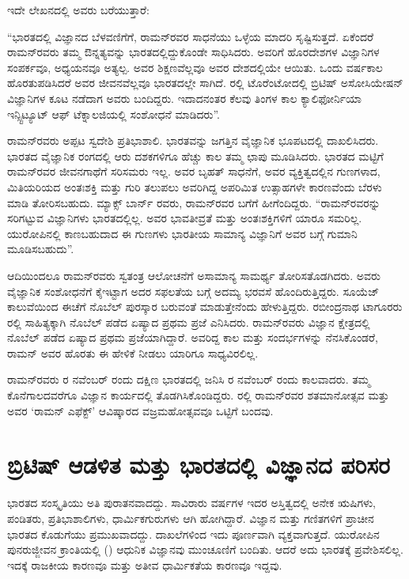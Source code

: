 ಇದೇ ಲೇಖನದಲ್ಲಿ ಅವರು ಬರೆಯುತ್ತಾರೆ:\enginline{-}

“ಭಾರತದಲ್ಲಿ ವಿಜ್ಞಾನದ ಬೆಳವಣಿಗೆಗೆ, ರಾಮನ್‍ರವರ ಸಾಧನೆಯು ಒಳ್ಳೆಯ ಮಾದರಿ ಸೃಷ್ಟಿಸುತ್ತದೆ. ಏಕೆಂದರೆ ರಾಮನ್‍ರವರು ತಮ್ಮ ಔನ್ನತ್ಯವನ್ನು ಭಾರತದಲ್ಲಿದ್ದುಕೊಂಡೇ ಸಾಧಿಸಿದರು. ಅವರಿಗೆ ಹೊರದೇಶಗಳ ವಿಜ್ಞಾನಿಗಳ ಸಂಪರ್ಕವೂ, ಅಧ್ಯಯನವೂ ಅತ್ಯಲ್ಪ. ಅವರ ಶಿಕ್ಷಣವೆಲ್ಲವೂ ಅವರ ದೇಶದಲ್ಲಿಯೇ ಆಯಿತು. ಒಂದು ವರ್ಷಕಾಲ ಹೊರತುಪಡಿಸಿದರೆ ಅವರ ಜೀವನವೆಲ್ಲವೂ ಭಾರತದಲ್ಲೇ ಸಾಗಿದೆ. ರಲ್ಲಿ ಟೊರೆಂಟೋದಲ್ಲಿ ಬ್ರಿಟಿಷ್ ಅಸೋಸಿಯೇಷನ್ ವಿಜ್ಞಾನಿಗಳ ಕೂಟ ನಡೆದಾಗ ಅವರು ಬಂದಿದ್ದರು. ಇದಾದನಂತರ ಕೆಲವು ತಿಂಗಳ ಕಾಲ ಕ್ಯಾಲಿಫೋರ್ನಿಯಾ ಇನ್ಸ್ಟಿಟ್ಯೂಟ್ ಆಫ್ ಟೆಕ್ನಾಲಜಿಯಲ್ಲಿ ಸಂಶೋಧನೆ ಮಾಡಿದರು”.

ರಾಮನ್‍ರವರು ಅಪ್ಪಟ ಸ್ವದೇಶಿ ಪ್ರತಿಭಾಶಾಲಿ. ಭಾರತವನ್ನು ಜಗತ್ತಿನ ವೈಜ್ಞಾನಿಕ ಭೂಪಟದಲ್ಲಿ ದಾಖಲಿಸಿದರು. ಭಾರತದ ವೈಜ್ಞಾನಿಕ ರಂಗದಲ್ಲಿ ಆರು ದಶಕಗಳಿಗೂ ಹೆಚ್ಚು ಕಾಲ ತಮ್ಮ ಛಾಪು ಮೂಡಿಸಿದರು. ಭಾರತದ ಮಟ್ಟಿಗೆ ರಾಮನ್‍ರವರ ಜೀವನಗಾಥೆಗೆ ಸರಿಸಮರು ಇಲ್ಲ. ಅವರ ಬೃಹತ್ ಸಾಧನೆಗೆ, ಅವರ ವ್ಯಕ್ತಿತ್ವದಲ್ಲಿನ ಗುಣಗಳಾದ, ಮಿತಿಯರಿಯದ ಅಂತಃಶಕ್ತಿ ಮತ್ತು ಗುರಿ ತಲುಪಲು ಅವರಿಗಿದ್ದ ಅಪರಿಮಿತ ಉತ್ಸಾಹಗಳೇ ಕಾರಣವೆಂದು ಬೆರಳು ಮಾಡಿ ತೋರಿಸಬಹುದು. ಮ್ಯಾಕ್ಸ್ ಬಾರ್ನ್ ರವರು, ರಾಮನ್‍ರವರ ಬಗೆಗೆ ಹೀಗೆಂದಿದ್ದರು.  “ರಾಮನ್‍ರವರನ್ನು ಸರಿಗಟ್ಟುವ ವಿಜ್ಞಾನಿಗಳು ಭಾರತದಲ್ಲಿಲ್ಲ. ಅವರ ಭಾವತೀವ್ರತೆ ಮತ್ತು ಅಂತಃಶಕ್ತಿಗಳಿಗೆ ಯಾರೂ ಸಮರಿಲ್ಲ. ಯುರೋಪಿನಲ್ಲಿ ಕಾಣಬಹುದಾದ ಈ ಗುಣಗಳು ಭಾರತೀಯ ಸಾಮಾನ್ಯ ವಿಜ್ಞಾನಿಗೆ ಅವರ ಬಗ್ಗೆ ಗುಮಾನಿ ಮೂಡಿಸಬಹುದು”.

ಆದಿಯಿಂದಲೂ ರಾಮನ್‍ರವರು ಸ್ವತಂತ್ರ ಆಲೋಚನೆಗೆ ಅಸಾಮಾನ್ಯ ಸಾಮರ್ಥ್ಯ ತೋರಿಸತೊಡಗಿದರು. ಅವರು ವೈಜ್ಞಾನಿಕ ಸಂಶೋಧನೆಗೆ ಕೈಇಟ್ಟಾಗ ಅದರ ಸಫಲತೆಯ ಬಗ್ಗೆ ಅದಮ್ಯ ಭರವಸೆ ಹೊಂದಿರುತ್ತಿದ್ದರು. ಸೂಯೆಜ್ ಕಾಲುವೆಯಿಂದ ಈಚೆಗೆ ನೊಬೆಲ್ ಪುರಸ್ಕಾರ ಬರುವಂತೆ ಮಾಡುತ್ತೇನೆಂದು ಹೇಳುತ್ತಿದ್ದರು. ರಬೀಂದ್ರನಾಥ ಟಾಗೂರರು ರಲ್ಲಿ ಸಾಹಿತ್ಯಕ್ಕಾಗಿ ನೊಬೆಲ್ ಪಡೆದ ಏಷ್ಯಾದ ಪ್ರಥಮ ಪ್ರಜೆ ಎನಿಸಿದರು. ರಾಮನ್‍ರವರು ವಿಜ್ಞಾನ ಕ್ಷೇತ್ರದಲ್ಲಿ ನೊಬೆಲ್ ಪಡೆದ ಏಷ್ಯಾದ ಪ್ರಥಮ ಪ್ರಜೆಯಾಗಿದ್ದಾರೆ. ಅವರಿದ್ದ ಕಾಲ ಮತ್ತು ಸಂದರ್ಭಗಳನ್ನು ನೆನಸಿಕೊಂಡರೆ, ರಾಮನ್‍ ಅವರ ಹೊರತು ಈ ಹೇಳಿಕೆ ನೀಡಲು ಯಾರಿಗೂ ಸಾಧ್ಯವಿರಲಿಲ್ಲ.

ರಾಮನ್‍ರವರು ರ ನವೆಂಬರ್ ರಂದು ದಕ್ಷಿಣ ಭಾರತದಲ್ಲಿ ಜನಿಸಿ ರ ನವೆಂಬರ್ ರಂದು ಕಾಲವಾದರು. ತಮ್ಮ ಕೊನೆಗಾಲದವರೆಗೂ ವಿಜ್ಞಾನ ಕಾರ್ಯದಲ್ಲಿ ತೊಡಗಿಸಿಕೊಂಡಿದ್ದರು. ರಲ್ಲಿ ರಾಮನ್‍ರವರ ಶತಮಾನೋತ್ಸವ ಮತ್ತು ಅವರ ‘ರಾಮನ್ ಎಫೆಕ್ಟ್’ ಆವಿಷ್ಕಾರದ ವಜ್ರಮಹೋತ್ಸವವೂ ಒಟ್ಟಿಗೆ ಬಂದವು.


\section{ಬ್ರಿಟಿಷ್ ಆಡಳಿತ ಮತ್ತು ಭಾರತದಲ್ಲಿ ವಿಜ್ಞಾನದ ಪರಿಸರ}

ಭಾರತದ ಸಂಸ್ಕೃತಿಯು ಅತಿ ಪುರಾತನವಾದದ್ದು. ಸಾವಿರಾರು ವರ್ಷಗಳ ಇದರ ಅಸ್ತಿತ್ವದಲ್ಲಿ ಅನೇಕ ಋಷಿಗಳು, ಪಂಡಿತರು, ಪ್ರತಿಭಾಶಾಲಿಗಳು, ಧಾರ್ಮಿಕಗುರುಗಳು ಆಗಿ ಹೋಗಿದ್ದಾರೆ. ವಿಜ್ಞಾನ ಮತ್ತು ಗಣಿತಗಳಿಗೆ ಪ್ರಾಚೀನ ಭಾರತದ ಕೊಡುಗೆಯು ಪ್ರಮುಖವಾದದ್ದು. ದಾಖಲೆಗಳಿಂದ ಇದು ಪೂರ್ಣವಾಗಿ ವ್ಯಕ್ತವಾಗುತ್ತದೆ. ಯುರೋಪಿನ ಪುನರುಜ್ಜೀವನ ಕ್ರಾಂತಿಯಲ್ಲಿ () ಆಧುನಿಕ ವಿಜ್ಞಾನವು ಮುಂಚೂಣಿಗೆ ಬಂದಿತು. ಆದರೆ ಅದು ಭಾರತಕ್ಕೆ ಪ್ರವೇಶಿಸಲಿಲ್ಲ. ಇದಕ್ಕೆ ರಾಜಕೀಯ ಕಾರಣವೂ ಮತ್ತು ಅತೀವ ಧಾರ್ಮಿಕತೆಯ ಕಾರಣವೂ ಇದ್ದವು.

